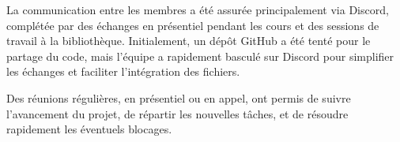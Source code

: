 La communication entre les membres a été assurée principalement via Discord, complétée par des échanges en présentiel pendant les cours et des sessions de travail à la bibliothèque.  
Initialement, un dépôt GitHub a été tenté pour le partage du code, mais l'équipe a rapidement basculé sur Discord pour simplifier les échanges et faciliter l'intégration des fichiers.

Des réunions régulières, en présentiel ou en appel, ont permis de suivre l'avancement du projet, de répartir les nouvelles tâches, et de résoudre rapidement les éventuels blocages.
